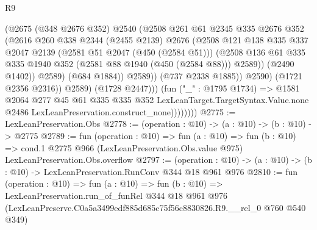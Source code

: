 \begin{lexlean}{R9}
\begin{coremodule}
                                  (@2675
                                    (@348 @2676 @352)
                                    @2540
                                    (@2508
                                      @261
                                      @61
                                      @2345
                                      @335
                                      @2676
                                      @352
                                      (@2616
                                        @260
                                        @338
                                        @2344
                                        (@2455 @2139)
                                        @2676
                                        (@2508
                                          @121
                                          @138
                                          @335
                                          @337
                                          @2047
                                          @2139
                                          (@2581 @51 @2047 (@450 (@2584 @51)))
                                          (@2508
                                            @136
                                            @61
                                            @335
                                            @335
                                            @1940
                                            @352
                                            (@2581 @88 @1940 (@450 (@2584 @88)))
                                            @2589))
                                        (@2490 @1402))
                                      @2589)
                                    (@684 @1884))
                                  @2589))
                              (@737 @2338 @1885))
                            @2590)
                          (@1721 @2356 @2316))
                        @2589)
                      (@1728 @2447)))
                  (fun ("_" : @1795 @1734) =>
                  @1581
                    @2064
                    @277
                    @45
                    @61
                    @335
                    @335
                    @352
                    LexLeanTarget.TargetSyntax.Value.none
                    @2486
                    LexLeanPreservation.construct_none))))))))
@2775 := LexLeanPreservation.Obs
@2778 := (operation : @10) -> (a : @10) -> (b : @10) -> @2775
@2789 := fun (operation : @10) =>
  fun (a : @10) =>
  fun (b : @10) =>
  cond.{1} @2775 @966 (LexLeanPreservation.Obs.value @975) LexLeanPreservation.Obs.overflow
@2797 := (operation : @10) ->
  (a : @10) -> (b : @10) -> LexLeanPreservation.RunConv @344 @18 @961 @976
@2810 := fun (operation : @10) =>
  fun (a : @10) =>
  fun (b : @10) =>
  LexLeanPreservation.run_of_funRel
    @344
    @18
    @961
    @976
    (LexLeanPreserve.C0a5a3499edf885d685c75f56c8830826.R9.__rel_0 @760 @540 @349)
\end{coremodule}
\end{lexlean}
